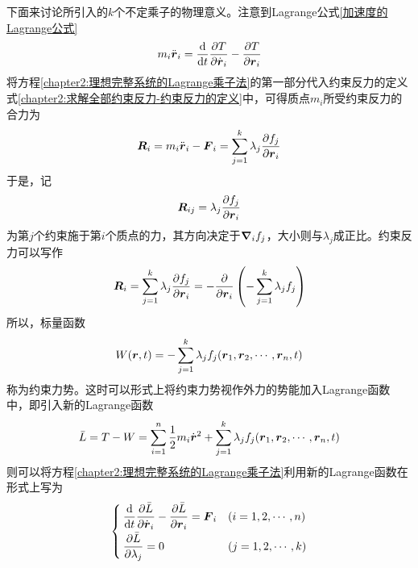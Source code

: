 下面来讨论所引入的$k$个不定乘子的物理意义。注意到Lagrange公式\eqref{加速度的Lagrange公式}
\begin{equation}
	m_i \ddot{\boldsymbol{r}}_i = \frac{\mathrm{d}}{\mathrm{d} t} \frac{\partial T}{\partial \dot{\boldsymbol{r}}_i} - \frac{\partial T}{\partial \boldsymbol{r}_i}
\end{equation}
将方程\eqref{chapter2:理想完整系统的Lagrange乘子法}的第一部分代入约束反力的定义式\eqref{chapter2:求解全部约束反力-约束反力的定义}中，可得质点$m_i$所受约束反力的合力为
\begin{equation}
	\boldsymbol{R}_i = m_i\ddot{\boldsymbol{r}}_i - \boldsymbol{F}_i = \sum_{j=1}^k \lambda_j \frac{\partial f_j}{\partial \boldsymbol{r}_i}
	\label{chapter2:第i个质点所受的约束反力的合力}
\end{equation}
于是，记
\begin{equation}
	\boldsymbol{R}_{ij} = \lambda_j \frac{\partial f_j}{\partial \boldsymbol{r}_i}
	\label{chapter2:第j个约束对第i个质点的约束反力}
\end{equation}
为第$j$个约束施于第$i$个质点的力，其方向决定于$\boldsymbol{\nabla}_i f_j$，大小则与$\lambda_j$成正比。约束反力可以写作
\begin{equation}
	\boldsymbol{R}_i = \sum_{j=1}^k \lambda_j \frac{\partial f_j}{\partial \boldsymbol{r}_i} = -\frac{\partial}{\partial \boldsymbol{r}_i} \left(-\sum_{j=1}^k \lambda_j f_j\right)
\end{equation}
所以，标量函数
\begin{equation}
	W(\boldsymbol{r},t) = -\sum_{j=1}^k \lambda_j f_j(\boldsymbol{r}_1,\boldsymbol{r}_2,\cdots,\boldsymbol{r}_n,t)
	\label{chapter2:约束力势的定义}
\end{equation}
称为{\heiti 约束力势}。这时可以形式上将约束力势视作外力的势能加入Lagrange函数中，即引入新的Lagrange函数
\begin{equation}
	\bar{L} = T-W = \sum_{i=1}^n \frac12 m_i \dot{\boldsymbol{r}}^2 + \sum_{j=1}^k \lambda_j f_j(\boldsymbol{r}_1,\boldsymbol{r}_2,\cdots,\boldsymbol{r}_n,t)
\end{equation}
则可以将方程\eqref{chapter2:理想完整系统的Lagrange乘子法}利用新的Lagrange函数在形式上写为
\begin{equation}
\begin{cases}
	\displaystyle \frac{\mathrm{d}}{\mathrm{d} t} \frac{\partial \bar{L}}{\partial \dot{\boldsymbol{r}}_i} - \frac{\partial \bar{L}}{\partial \boldsymbol{r}_i} = \boldsymbol{F}_i & (i=1,2,\cdots,n) \\[1.5ex]
	\displaystyle \frac{\partial \bar{L}}{\partial \lambda_j} = 0 & (j = 1,2,\cdots,k)
\end{cases}
\end{equation}

